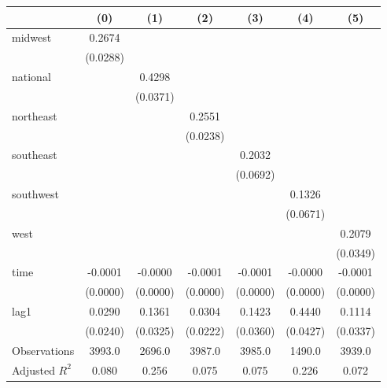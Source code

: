 \begin{tabular}{lcccccc}
\toprule
 & (0) & (1) & (2) & (3) & (4) & (5) \\
\midrule
midwest & 0.2674 &  &  &  &  &  \\
\vspace{0.2cm}
 & (0.0288) &  &  &  &  &  \\
national &  & 0.4298 &  &  &  &  \\
\vspace{0.2cm}
 &  & (0.0371) &  &  &  &  \\
northeast &  &  & 0.2551 &  &  &  \\
\vspace{0.2cm}
 &  &  & (0.0238) &  &  &  \\
southeast &  &  &  & 0.2032 &  &  \\
\vspace{0.2cm}
 &  &  &  & (0.0692) &  &  \\
southwest &  &  &  &  & 0.1326 &  \\
\vspace{0.2cm}
 &  &  &  &  & (0.0671) &  \\
west &  &  &  &  &  & 0.2079 \\
\vspace{0.2cm}
 &  &  &  &  &  & (0.0349) \\
time & -0.0001 & -0.0000 & -0.0001 & -0.0001 & -0.0000 & -0.0001 \\
\vspace{0.2cm}
 & (0.0000) & (0.0000) & (0.0000) & (0.0000) & (0.0000) & (0.0000) \\
lag1 & 0.0290 & 0.1361 & 0.0304 & 0.1423 & 0.4440 & 0.1114 \\
\vspace{0.2cm}
 & (0.0240) & (0.0325) & (0.0222) & (0.0360) & (0.0427) & (0.0337) \\
\midrule
Observations & 3993.0 & 2696.0 & 3987.0 & 3985.0 & 1490.0 & 3939.0 \\
Adjusted $R^2$ & 0.080 & 0.256 & 0.075 & 0.075 & 0.226 & 0.072 \\
\bottomrule
\end{tabular}